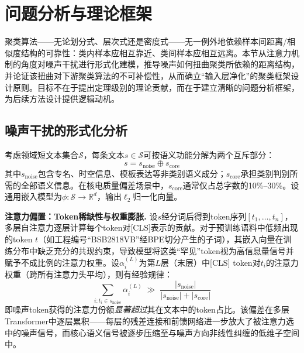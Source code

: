 \documentclass[10.5pt,compsoc,UTF8]{CjC}
\theoremstyle{mystyle}
\newcommand{\R}{\mathbb{R}}
\begin{document}
\section{\heiti 问题分析与理论框架}
\label{sec:theory}

聚类算法——无论划分式、层次式还是密度式——无一例外地依赖样本间距离/相似度结构的可靠性：类内样本应相互靠近、类间样本应相互远离。本节从注意力机制的角度对噪声干扰进行形式化建模，推导噪声如何扭曲聚类所依赖的距离结构，并论证该扭曲对下游聚类算法的不可补偿性，从而确立``输入层净化''的聚类框架设计原则。目标不在于提出定理级别的理论贡献，而在于建立清晰的问题分析框架，为后续方法设计提供逻辑动机。

{\heiti \subsection{噪声干扰的形式化分析}}

考虑领域短文本集合$\mathcal{S}$，每条文本$s \in \mathcal{S}$可按语义功能分解为两个互斥部分：
\begin{equation}
s = s_{\text{noise}} \oplus s_{\text{core}}
\label{eq:decomp}
\end{equation}
其中$s_{\text{noise}}$包含专名、时空信息、模板表达等非类别语义成分；$s_{\text{core}}$承担类别判别所需的全部语义信息。在核电质量偏差场景中，$s_{\text{core}}$通常仅占总字数的10\%--30\%。设通用嵌入模型为$\phi: \mathcal{S} \to \R^d$，输出$\ell_2$归一化向量。

\textbf{注意力偏置：Token稀缺性与权重膨胀.} 设$s$经分词后得到token序列$[t_1,\ldots,t_n]$，多层自注意力逐层计算每个token对[CLS]表示的贡献。对于预训练语料中低频出现的token $t$（如工程编号``BSB2818VB''经BPE切分产生的子词），其嵌入向量在训练分布中缺乏充分的共现约束，导致模型将这类``罕见''token视为高信息量信号并赋予不成比例的注意力权重。设$\alpha_i^{(L)}$为第$L$层（末层）中[CLS] token对$t_i$的注意力权重（跨所有注意力头平均），则有经验规律：
\begin{equation}
\sum_{i: t_i \in s_{\text{noise}}} \alpha_i^{(L)} \;\gg\; \frac{|s_{\text{noise}}|}{|s_{\text{noise}}| + |s_{\text{core}}|}
\label{eq:attn_bias}
\end{equation}
即噪声token获得的注意力份额\emph{显著超过}其在文本中的token占比。该偏差在多层Transformer中逐层累积——每层的残差连接和前馈网络进一步放大了被注意力选中的噪声信号，而核心语义信号被逐步压缩至与噪声方向非线性纠缠的低维子空间中。
\end{document}
